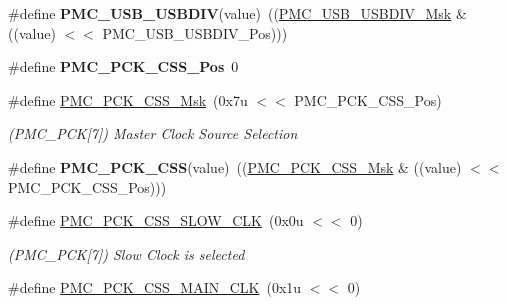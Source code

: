 \begin{DoxyCompactItemize}
\mbox{\label{group__SAMV71__PMC_ga3cfa88f5a6b2b7603b3edf9672e5a7f3}} 
\#define {\bfseries P\+M\+C\+\_\+\+U\+S\+B\+\_\+\+U\+S\+B\+D\+IV}(value)~((\mbox{\hyperlink{group__SAMV71__PMC_gabb062c3f15ab096e8ea86a30d4ba7293}{P\+M\+C\+\_\+\+U\+S\+B\+\_\+\+U\+S\+B\+D\+I\+V\+\_\+\+Msk}} \& ((value) $<$$<$ P\+M\+C\+\_\+\+U\+S\+B\+\_\+\+U\+S\+B\+D\+I\+V\+\_\+\+Pos)))
\item 
\mbox{\label{group__SAMV71__PMC_gaeb2591f58195c0810f323ea1da2ea7cc}} 
\#define {\bfseries P\+M\+C\+\_\+\+P\+C\+K\+\_\+\+C\+S\+S\+\_\+\+Pos}~0
\item 
\mbox{\label{group__SAMV71__PMC_ga674cfaca042723467fab0808cc17fa46}} 
\#define \mbox{\hyperlink{group__SAMV71__PMC_ga674cfaca042723467fab0808cc17fa46}{P\+M\+C\+\_\+\+P\+C\+K\+\_\+\+C\+S\+S\+\_\+\+Msk}}~(0x7u $<$$<$ P\+M\+C\+\_\+\+P\+C\+K\+\_\+\+C\+S\+S\+\_\+\+Pos)
\begin{DoxyCompactList}\small\item\em (P\+M\+C\+\_\+\+P\+CK\mbox{[}7\mbox{]}) Master Clock Source Selection \end{DoxyCompactList}\item 
\mbox{\label{group__SAMV71__PMC_ga63684d30fb828b6081a7c39cb034f652}} 
\#define {\bfseries P\+M\+C\+\_\+\+P\+C\+K\+\_\+\+C\+SS}(value)~((\mbox{\hyperlink{group__SAMV71__PMC_ga674cfaca042723467fab0808cc17fa46}{P\+M\+C\+\_\+\+P\+C\+K\+\_\+\+C\+S\+S\+\_\+\+Msk}} \& ((value) $<$$<$ P\+M\+C\+\_\+\+P\+C\+K\+\_\+\+C\+S\+S\+\_\+\+Pos)))
\item 
\mbox{\label{group__SAMV71__PMC_ga82909c82066c3acdf728698a4136265c}} 
\#define \mbox{\hyperlink{group__SAMV71__PMC_ga82909c82066c3acdf728698a4136265c}{P\+M\+C\+\_\+\+P\+C\+K\+\_\+\+C\+S\+S\+\_\+\+S\+L\+O\+W\+\_\+\+C\+LK}}~(0x0u $<$$<$ 0)
\begin{DoxyCompactList}\small\item\em (P\+M\+C\+\_\+\+P\+CK\mbox{[}7\mbox{]}) Slow Clock is selected \end{DoxyCompactList}\item 
\mbox{\label{group__SAMV71__PMC_ga9d28f7ac2092e8157abf6e51a2b4dd8d}} 
\#define \mbox{\hyperlink{group__SAMV71__PMC_ga9d28f7ac2092e8157abf6e51a2b4dd8d}{P\+M\+C\+\_\+\+P\+C\+K\+\_\+\+C\+S\+S\+\_\+\+M\+A\+I\+N\+\_\+\+C\+LK}}~(0x1u $<$$<$ 0)
$$
\end{DoxyCompactItemize}
